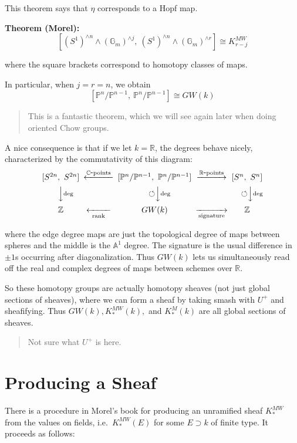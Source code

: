 \documentclass[11pt]{scrreprt}
\theoremstyle{definition}
\newcommand{\RR}[0]{{\mathbb{R}}}
\newcommand{\ZZ}[0]{{\mathbb{Z}}}
\newcommand{\CC}[0]{{\mathbb{C}}}
\newcommand{\PP}[0]{{\mathbb{P}}}
\newcommand{\Af}[0]{{\mathbb{A}}}
\newcommand{\selfmap}[0]{{\circlearrowleft}}
\newcommand{\dash}[0]{{\hbox{-}}}
\newcommand{\GG}[0]{{\mathbb{G}}}
\begin{document}
This theorem says that \(\eta\) corresponds to a Hopf map.

\textbf{Theorem (Morel):} \[
[(S^1)^{\wedge n} \wedge (\GG_m)^{\wedge j},~ (S^1)^{\wedge n} \wedge (\GG_m)^{\wedge r}] \cong K^{MW}_{r-j}
\]

where the square brackets correspond to homotopy classes of maps.

In particular, when \(j=r=n\), we obtain \[
[\PP^n /\PP^{n-1},~ \PP^n /\PP^{n-1}] \cong GW(k)
\]

\begin{quote}
This is a fantastic theorem, which we will see again later when doing
oriented Chow groups.
\end{quote}

A nice consequence is that if we let \(k=\RR\), the degrees behave
nicely, characterized by the commutativity of this diagram: \[
\begin{CD}
[S^{2n},~S^{2n}] @<\CC\dash\text{points}<< [\PP^n /\PP^{n-1},~ \PP^n /\PP^{n-1}] @>\RR\dash\text{points}>> [S^n,~S^n] \\
@VV\deg V \selfmap @VV\deg V \selfmap @VV\deg V \\
\ZZ @<<\text{rank}< GW(k) @>>\text{signature}> \ZZ
\end{CD}
\]

where the edge degree maps are just the topological degree of maps
between spheres and the middle is the \(\Af^1\) degree. The signature is
the usual difference in \(\pm 1\)s occurring after diagonalization. Thus
\(GW(k)\) lets us simultaneously read off the real and complex degrees
of maps between schemes over \(\RR\).

So these homotopy groups are actually homotopy sheaves (not just global
sections of sheaves), where we can form a sheaf by taking smash with
\(U^+\) and sheafifying. Thus \(GW(k), K^{MW}_*(k),\) and \(K^M_*(k)\)
are all global sections of sheaves.

\begin{quote}
Not sure what \(U^+\) is here.
\end{quote}

\hypertarget{producing-a-sheaf}{%
\section{Producing a Sheaf}\label{producing-a-sheaf}}

There is a procedure in Morel's book for producing an unramified sheaf
\(K^{MW}_*\) from the values on fields, i.e.~\(K^{MW}_*(E)\) for some
\(E \supset k\) of finite type. It proceeds as follows:
\end{document}
